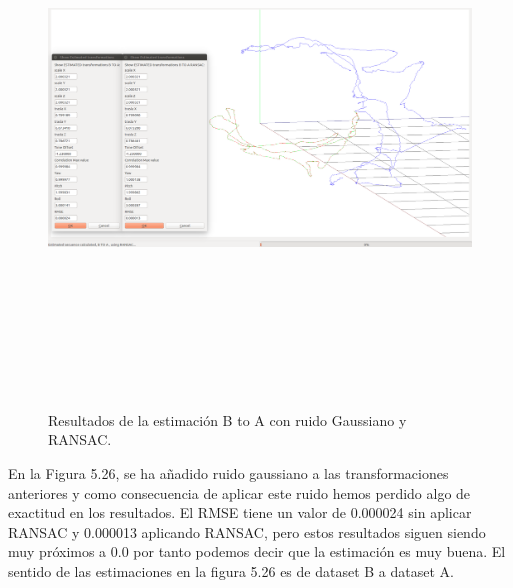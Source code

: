 \begin{figure}[H]
\begin{center}
\label{fig:opciones de View}\includegraphics[height=14.0cm,width=18.0cm]{img/cap6/newData_EscalaTraslaRotaGauss_ba.png}
\hspace{0.5cm}

\end{center}

\caption{Resultados de la estimación B to A con ruido Gaussiano y RANSAC.}
\end{figure}
En la Figura 5.26, se ha añadido ruido gaussiano a las transformaciones anteriores y como consecuencia de aplicar este ruido hemos perdido algo de exactitud en los resultados.
El RMSE tiene un valor de 0.000024 sin aplicar RANSAC y 0.000013 aplicando RANSAC, pero estos resultados siguen siendo muy próximos a 0.0 por tanto podemos decir que la estimación es muy buena.
El sentido de las estimaciones en la figura 5.26 es de dataset B a dataset A.


